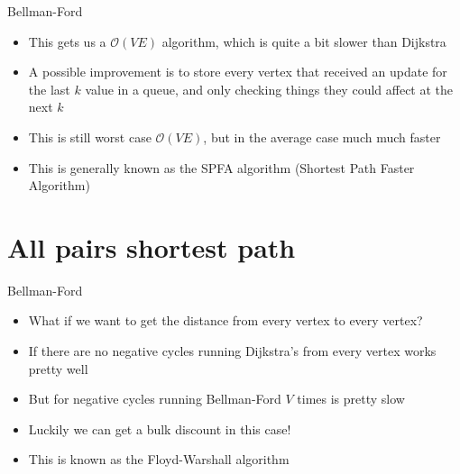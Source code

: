 \documentclass{beamer}
\begin{document}
\begin{frame}[plain]{Bellman-Ford}
    \begin{itemize}
    \item This gets us a $\mathcal{O}(VE)$ algorithm, which is quite a bit slower than Dijkstra
    \item A possible improvement is to store every vertex that received an update for the last $k$ value in a queue, and only checking things they could affect at the next $k$
    \item This is still worst case $\mathcal{O}(VE)$, but in the average case much much faster
    \item This is generally known as the SPFA algorithm (Shortest Path Faster Algorithm)
    \end{itemize}
\end{frame}

\section*{All pairs shortest path}

\begin{frame}[plain]{Bellman-Ford}
    \begin{itemize}
    \item What if we want to get the distance from every vertex to every vertex?
    \item If there are no negative cycles running Dijkstra's from every vertex works pretty well
    \item But for negative cycles running Bellman-Ford $V$ times is pretty slow
    \item Luckily we can get a bulk discount in this case!
    \item This is known as the Floyd-Warshall algorithm
    \end{itemize}
\end{frame}
\end{document}
